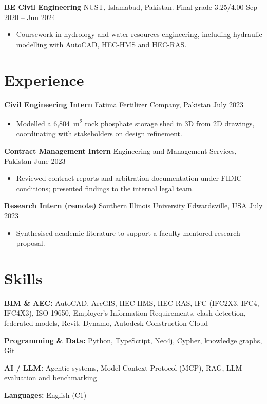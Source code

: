 \documentclass[a4paper,10.5pt]{article}
\newcommand{\datefill}{\dotfill}
\newcommand{\entry}[3]{\vspace{2.5pt}\noindent\textbf{#1} \textbar{} #2 \datefill{} #3\par\vspace{0.5pt}}
\newcommand{\skillrow}[2]{\noindent\textbf{#1:} #2\par\vspace{1pt}}
\begin{document}
\entry{BE Civil Engineering}{NUST, Islamabad, Pakistan. Final grade 3.25/4.00}{Sep 2020 -- Jun 2024}
\begin{itemize}
  \item Coursework in hydrology and water resources engineering, including hydraulic
        modelling with AutoCAD, HEC-HMS and HEC-RAS.
\end{itemize}

\section{Experience}
\entry{Civil Engineering Intern}{Fatima Fertilizer Company, Pakistan}{July 2023}
\begin{itemize}
  \item Modelled a 6,804~m\textsuperscript{2} rock phosphate storage shed in 3D from
        2D drawings, coordinating with stakeholders on design refinement.
\end{itemize}

\entry{Contract Management Intern}{Engineering and Management Services, Pakistan}{June 2023}
\begin{itemize}
  \item Reviewed contract reports and arbitration documentation under FIDIC
        conditions; presented findings to the internal legal team.
\end{itemize}

\entry{Research Intern (remote)}{Southern Illinois University Edwardsville, USA}{July 2023}
\begin{itemize}
  \item Synthesised academic literature to support a faculty-mentored research proposal.
\end{itemize}

\section{Skills}

\skillrow{BIM \& AEC}{AutoCAD, ArcGIS, HEC-HMS, HEC-RAS, IFC (IFC2X3, IFC4, IFC4X3), ISO 19650, Employer's Information Requirements, clash detection, federated models, Revit, Dynamo, Autodesk Construction Cloud}
\skillrow{Programming \& Data}{Python, TypeScript, Neo4j, Cypher, knowledge graphs, Git}
\skillrow{AI / LLM}{Agentic systems, Model Context Protocol (MCP), RAG, LLM evaluation and benchmarking}

\skillrow{Languages}{English (C1)}
\end{document}
